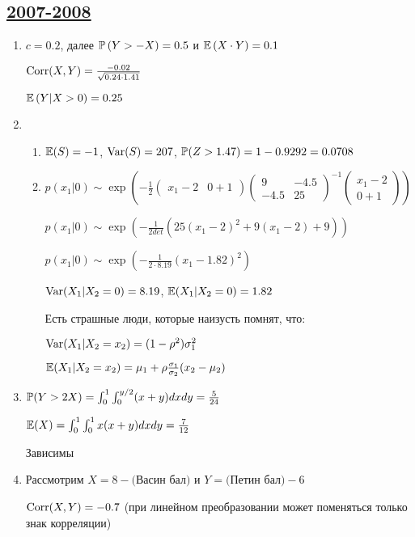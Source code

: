 \subsection[2007-2008]{\hyperref[sec:kr_02_2007_2008]{2007-2008}}
\label{sec:sol_kr_02_2007_2008}

\begin{enumerate}
\item $c = 0.2$, далее $\P\left(Y>-X\right)=0.5$  и $\E\left(X\cdot Y\right)=0.1$

$\Corr(X,Y)=\frac{-0.02}{\sqrt{0.24\cdot 1.41}}$

$\E\left(Y|X>0\right)=0.25$
\item
\begin{enumerate}
\item $\E(S)=-1$, $\Var(S)=207$, $\P(Z>1.47)=1-0.9292=0.0708$
\item $p(x_{1}|0)\sim \exp\left(-\frac{1}{2}\left(\begin{array}{cc} {x_{1}-2} & {0+1} \end{array}\right) \left(\begin{array}{cc} {9} & {-4.5} \\ {-4.5} & {25}
\end{array}\right)^{-1}\left(\begin{array}{c} {x_{1}-2} \\ {0+1}
\end{array}\right)\right)$

$p(x_{1}|0)\sim \exp\left(-\frac{1}{2det}(25(x_{1}-2)^{2}+9(x_{1}-2)+9)\right)$

$p(x_{1}|0)\sim \exp\left(-\frac{1}{2\cdot 8.19}(x_{1}-1.82)^{2}\right)$

$\Var(X_{1}|X_{2}=0)=8.19$, $\E(X_{1}|X_{2}=0)=1.82$

Есть страшные люди, которые наизусть помнят, что:

$\Var(X_{1}|X_{2}=x_{2})=(1-\rho^{2})\sigma_{1}^{2}$

$\E(X_{1}|X_{2}=x_{2})=\mu_{1} + \rho\frac{\sigma_{1}}{\sigma_{2}}(x_{2}-\mu_{2})$
\end{enumerate}
\item $\P(Y>2X)=\int_{0}^{1}\int_{0}^{y/2}(x+y)dxdy=\frac{5}{24}$

$\E(X)=\int_{0}^{1}\int_{0}^{1}x(x+y)dxdy=\frac{7}{12}$

Зависимы
\item Рассмотрим $X=8-($Васин бал$)$ и $Y=($Петин бал$)-6$

$\Corr(X,Y)=-0.7$ (при линейном преобразовании может поменяться только знак корреляции)


\end{enumerate}
